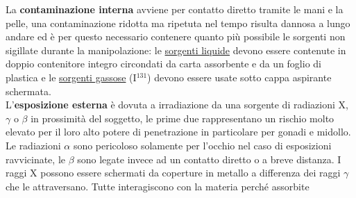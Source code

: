 \documentclass[10pt]{article}
\begin{document}
La \textbf{contaminazione interna} avviene per contatto diretto tramite le mani e la pelle, una contaminazione ridotta ma ripetuta nel tempo risulta dannosa a lungo andare ed è per questo necessario contenere quanto più possibile le sorgenti non sigillate durante la manipolazione: le \underline{sorgenti liquide} devono essere contenute in doppio contenitore integro circondati da carta assorbente e da un foglio di plastica e le \underline{sorgenti gassose} (I$^{131}$) devono essere usate sotto cappa aspirante schermata. \\
L'\textbf{esposizione esterna} è dovuta a irradiazione da una sorgente di radiazioni X, $\gamma$ o $\beta$ in prossimità del soggetto, le prime due rappresentano un rischio molto elevato per il loro alto potere di penetrazione in particolare per gonadi e midollo. Le radiazioni $\alpha$ sono pericoloso solamente per l'occhio nel caso di esposizioni ravvicinate, le $\beta$ sono legate invece ad un contatto diretto o a breve distanza. I raggi X possono essere schermati da coperture in metallo a differenza dei raggi $\gamma$ che le attraversano. Tutte interagiscono con la materia perché assorbite 
\end{document}
